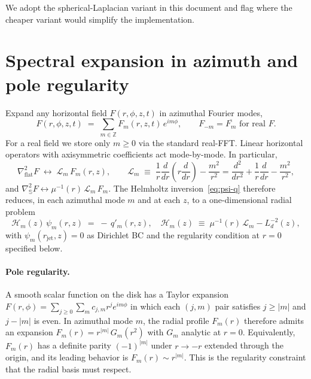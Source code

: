 \documentclass[11pt]{article}
\newcommand{\Lapproj}{\nabla^2_{\!\mathrm{flat}}}
\newcommand{\Lapsphere}{\nabla^2_{\!\mathbb{S}}}
\newcommand{\Ld}{L_d}
\newcommand{\rjet}{r_{\mathrm{jet}}}
\begin{document}
We adopt the spherical-Laplacian variant in this document and flag
where the cheaper variant would simplify the implementation.

\section{Spectral expansion in azimuth and pole regularity}

Expand any horizontal field $F(r,\phi,z,t)$ in azimuthal Fourier modes,
\begin{equation}
  F(r,\phi,z,t) \;=\; \sum_{m \in \mathbb{Z}} F_{m}(r,z,t)\,e^{i m \phi},
  \qquad
  F_{-m} = \overline{F_{m}} \text{ for real } F.
  \label{eq:Fourier-azim}
\end{equation}
For a real field we store only $m \ge 0$ via the standard real-FFT.
Linear horizontal operators with axisymmetric coefficients act
mode-by-mode.  In particular,
\begin{equation}
  \Lapproj F \;\longleftrightarrow\;
  \mathcal{L}_{m}\,F_{m}(r,z),
  \qquad
  \mathcal{L}_{m} \;\equiv\;
  \frac{1}{r}\frac{d}{dr}\!\left(r\frac{d}{dr}\right) - \frac{m^{2}}{r^{2}}
  = \frac{d^{2}}{dr^{2}} + \frac{1}{r}\frac{d}{dr} - \frac{m^{2}}{r^{2}},
  \label{eq:Lm-flat}
\end{equation}
and $\Lapsphere F \leftrightarrow \mu^{-1}(r)\,\mathcal{L}_{m}\,F_{m}$.
The Helmholtz inversion~\eqref{eq:psi-q} therefore reduces, in each
azimuthal mode $m$ and at each $z$, to a one-dimensional radial
problem
\begin{equation}
  \boxed{\;\;
  \mathcal{H}_{m}(z)\,\psi_{m}(r,z) \;=\; -\,q'_{m}(r,z),
  \quad
  \mathcal{H}_{m}(z) \;\equiv\;
  \mu^{-1}(r)\,\mathcal{L}_{m} - \Ld^{-2}(z),
  \;\;}
  \label{eq:Hm}
\end{equation}
with $\psi_{m}(\rjet, z) = 0$ as Dirichlet BC and the regularity
condition at $r = 0$ specified below.

\paragraph{Pole regularity.}
A smooth scalar function on the disk has a Taylor expansion
$F(r,\phi) = \sum_{j \ge 0}\sum_{m} c_{j,m} r^{j} e^{im\phi}$ in which
each $(j, m)$ pair satisfies $j \ge |m|$ and $j - |m|$ is even.  In
azimuthal mode $m$, the radial profile $F_{m}(r)$ therefore admits an
expansion $F_{m}(r) = r^{|m|}\,G_{m}(r^{2})$ with $G_{m}$ analytic at
$r=0$.  Equivalently, $F_{m}(r)$ has a definite parity $(-1)^{|m|}$
under $r \to -r$ extended through the origin, and its leading behavior
is $F_{m}(r) \sim r^{|m|}$.  This is the regularity constraint that
the radial basis must respect.
\end{document}
